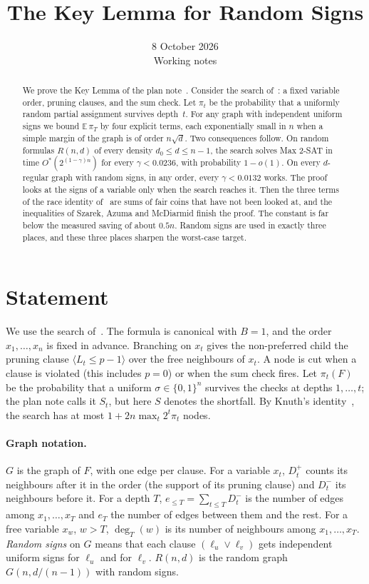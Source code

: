 \documentclass[11pt,a4paper]{article}
\title{The Key Lemma for Random Signs}
\author{}
\date{8 October 2026\\[3pt]\small Working notes}
\theoremstyle{remark}
\newcommand{\Ostar}{O^{*}}
\newcommand{\E}{\mathbb{E}}
\begin{document}
\maketitle

\begin{abstract}
We prove the Key Lemma of the plan note~\cite{N7}. Consider the search
of~\cite{N7}: a fixed variable order, pruning clauses, and the sum check. Let
$\pi_t$ be the probability that a uniformly random partial assignment survives
depth~$t$. For any graph with independent uniform signs we bound
$\E\,\pi_T$ by four explicit terms, each exponentially small in $n$ when a
simple margin of the graph is of order $n\sqrt d$. Two consequences follow. On random
formulas $R(n,d)$ of every density $d_0\le d\le n-1$, the search solves Max
2-SAT in time $\Ostar(2^{(1-\gamma)n})$ for every $\gamma<0.0236$, with
probability $1-o(1)$. On every $d$-regular graph with random signs, in any
order, every $\gamma<0.0132$ works. The proof looks at the signs of a variable
only when the search reaches it. Then the three terms of the race identity
of~\cite{N7} are sums of fair coins that have not been looked at, and the
inequalities of Szarek, Azuma and McDiarmid finish the proof. The constant is
far below the measured saving of about $0.5n$. Random signs are used in exactly
three places, and these three places sharpen the worst-case target.
\end{abstract}

\section{Statement}\label{sec:statement}

We use the search of~\cite[Section~2]{N7}. The formula is canonical with
$B=1$, and the order $x_1,\dots,x_n$ is fixed in advance. Branching on $x_t$
gives the non-preferred child the pruning clause $\langle L_t\le p-1\rangle$
over the free neighbours of $x_t$. A node is cut when a clause is violated
(this includes $p=0$) or when the sum check fires. Let $\pi_t(F)$ be the
probability that a uniform $\sigma\in\{0,1\}^n$ survives the checks at depths
$1,\dots,t$; the plan note calls it $S_t$, but here $S$ denotes the shortfall.
By Knuth's identity~\cite[Proposition~1]{N7}, the search has at most
$1+2n\max_t2^t\pi_t$ nodes.

\paragraph{Graph notation.} $G$ is the graph of $F$, with one edge per clause.
For a variable $x_t$, $D^+_t$ counts its neighbours after it in the order (the
support of its pruning clause) and $D^-_t$ its neighbours before it. For a
depth $T$, $e_{\le T}=\sum_{t\le T}D^-_t$ is the number of edges among
$x_1,\dots,x_T$ and $e_T$ the number of edges between them and the rest. For a
free variable $x_w$, $w>T$, $\deg_T(w)$ is its number of neighbours among
$x_1,\dots,x_T$. \emph{Random signs} on $G$ means that each clause
$(\ell_u\vee\ell_v)$ gets independent uniform signs for $\ell_u$ and for
$\ell_v$. $R(n,d)$ is the random graph $G(n,d/(n-1))$ with random signs.
\end{document}
